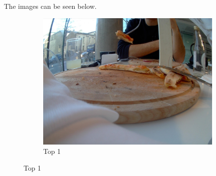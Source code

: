 The images can be seen below.

\begin{figure}[H]
  \centering
  \captionsetup{justification=centering}

  \begin{subfigure}{0.32\textwidth}
  \includegraphics[width=\textwidth]{Sections/7Results/images/top1.jpg} 
  \caption{Top 1}


\end{subfigure}
\end{figure}
